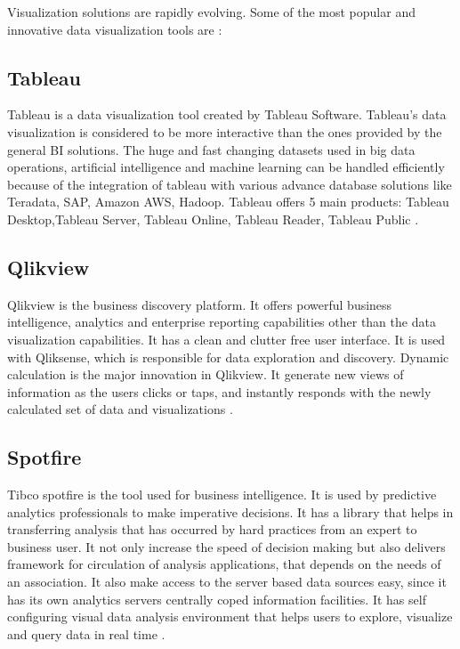 Visualization solutions are rapidly evolving. Some of the most popular and innovative data visualization tools are : 
\subsection{Tableau}

Tableau is a data visualization tool created by Tableau Software. Tableau’s data visualization is considered to be more interactive than the ones provided by the general BI solutions. The huge and fast changing datasets used in big data operations, artificial intelligence and machine learning can be handled efficiently because of the integration of tableau with various advance database solutions like Teradata, SAP, Amazon AWS, Hadoop. Tableau offers 5 main products: Tableau Desktop,Tableau Server, Tableau Online, Tableau Reader, Tableau Public \cite{Tableau}.\\

\subsection{Qlikview}

Qlikview is the business discovery platform. It offers powerful business intelligence, analytics and enterprise reporting capabilities other than the data visualization capabilities. It has a clean and clutter free user interface. It is used with Qliksense, which is responsible for data exploration and discovery. Dynamic calculation is the major innovation in Qlikview. It generate new views of information as the users clicks or taps, and instantly responds with the newly calculated set of data and visualizations \cite{Qlikview}.

\subsection{Spotfire}

Tibco spotfire is the tool used for business intelligence. It is used by predictive analytics professionals to make imperative decisions. It has a library that helps in transferring analysis that has occurred by hard practices from an expert to business user. It not only increase the speed of decision making but also delivers framework for circulation of analysis applications, that depends on the needs of an association. It also make access to the server based data sources easy, since it has its own analytics servers centrally coped information facilities. It has self configuring visual data analysis environment that helps users to explore, visualize and query data in real time \cite{Spotfire}.

